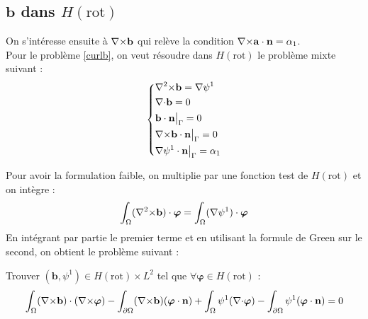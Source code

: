 \subsection{$\mathbf{b}$ dans $H(\mathrm{rot})$}
On s'intéresse ensuite à ${\nabla\times}\mathbf{b}$ qui relève la condition ${\nabla\times}\mathbf{a}\cdot\mathbf{n}=\alpha_1$.\\
Pour le problème \ref{curlb}, on veut résoudre dans $H(\mathrm{rot})$ le problème mixte suivant : 
\begin{equation*}
\left\{\begin{aligned}
&{\nabla^2\times} \mathbf{b} = {\nabla}\psi^1\\
&{\nabla\cdot} \mathbf{b} = 0\\
&\mathbf{b}\cdot \mathbf{n}{\big\rvert_{\Gamma}} = 0\\
&{\nabla\times} \mathbf{b}\cdot \mathbf{n}{\big\rvert_{\Gamma}} = 0\\
&{\nabla}\psi^1\cdot \mathbf{n}{\big\rvert_{\Gamma}} = \alpha_1
\end{aligned}\right.
\end{equation*}

Pour avoir la formulation faible, on multiplie par une fonction test de $H(\mathrm{rot})$ et on intègre :
\[ \int_\Omega ({\nabla^2\times} \mathbf{b})\cdot\bm{\varphi} = \int_\Omega ({\nabla}\psi^1)\cdot\bm{\varphi} \]
En intégrant par partie le premier terme et en utilisant la formule de Green sur le second, on obtient le problème suivant :
\begin{pb} \label{fvbcurl}
Trouver $(\mathbf{b},\psi^1)\in H(\mathrm{rot})\times L^2$ tel que $\forall \bm{\varphi}\in H(\mathrm{rot})$ :
\begin{equation*}
\int_\Omega ({\nabla\times} \mathbf{b})\cdot({\nabla\times}\bm{\varphi}) - \int_{\partial\Omega} ({\nabla\times} \mathbf{b})(\bm{\varphi}\cdot \mathbf{n}) + \int_\Omega \psi^1({\nabla\cdot}\bm{\varphi}) - \int_{\partial\Omega} \psi^1(\bm{\varphi}\cdot \mathbf{n}) = 0
\end{equation*}\end{pb}

